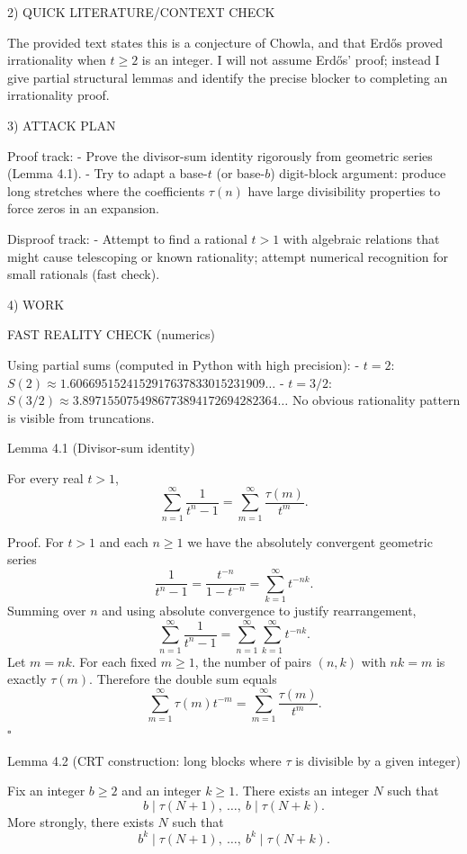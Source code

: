 2) QUICK LITERATURE/CONTEXT CHECK

The provided text states this is a conjecture of Chowla, and that Erd\H{o}s proved irrationality when
$t\ge 2$ is an integer. I will not assume Erd\H{o}s' proof; instead I give partial structural lemmas
and identify the precise blocker to completing an irrationality proof.

3) ATTACK PLAN

Proof track:
- Prove the divisor-sum identity rigorously from geometric series (Lemma 4.1).
- Try to adapt a base-$t$ (or base-$b$) digit-block argument: produce long stretches where the
  coefficients $\tau(n)$ have large divisibility properties to force zeros in an expansion.

Disproof track:
- Attempt to find a rational $t>1$ with algebraic relations that might cause telescoping or known
  rationality; attempt numerical recognition for small rationals (fast check).

4) WORK

FAST REALITY CHECK (numerics)

Using partial sums (computed in Python with high precision):
- $t=2$: $S(2)\approx 1.6066951524152917637833015231909\dots$
- $t=3/2$: $S(3/2)\approx 3.8971550754986773894172694282364\dots$
No obvious rationality pattern is visible from truncations.

Lemma 4.1 (Divisor-sum identity)

For every real $t>1$,
\[
  \sum_{n=1}^\infty \frac{1}{t^n-1}=\sum_{m=1}^\infty \frac{\tau(m)}{t^m}.
\]

Proof.
For $t>1$ and each $n\ge 1$ we have the absolutely convergent geometric series
\[
  \frac{1}{t^n-1} = \frac{t^{-n}}{1-t^{-n}} = \sum_{k=1}^\infty t^{-nk}.
\]
Summing over $n$ and using absolute convergence to justify rearrangement,
\[
  \sum_{n=1}^\infty \frac{1}{t^n-1} = \sum_{n=1}^\infty\sum_{k=1}^\infty t^{-nk}.
\]
Let $m=nk$. For each fixed $m\ge 1$, the number of pairs $(n,k)$ with $nk=m$ is exactly $\tau(m)$.
Therefore the double sum equals
\[
  \sum_{m=1}^\infty \tau(m) t^{-m} = \sum_{m=1}^\infty \frac{\tau(m)}{t^m}.
\]
$\square$

Lemma 4.2 (CRT construction: long blocks where $\tau$ is divisible by a given integer)

Fix an integer $b\ge 2$ and an integer $k\ge 1$.
There exists an integer $N$ such that
\[
  b\mid \tau(N+1),\ \dots,\ b\mid\tau(N+k).
\]
More strongly, there exists $N$ such that
\[
  b^k \mid \tau(N+1),\ \dots,\ b^k\mid\tau(N+k).
\]

